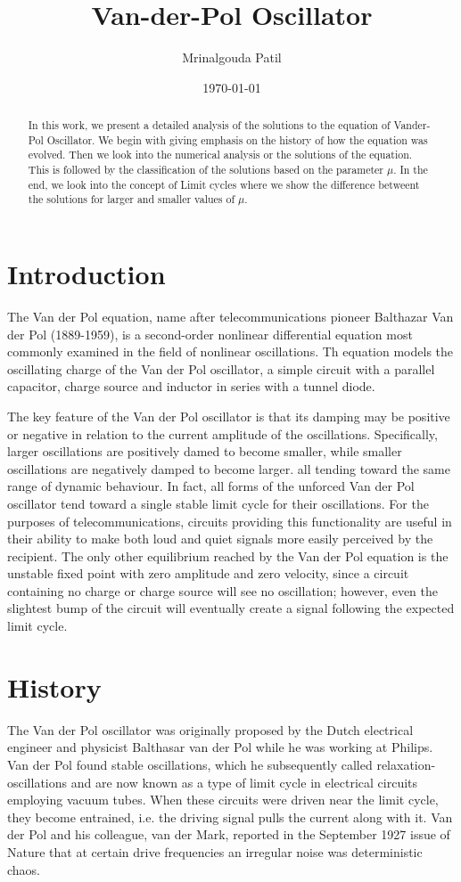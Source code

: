 \documentclass[12pt, a4paper]{report}
\title{Van-der-Pol Oscillator}
\author{Mrinalgouda Patil}
\affil{Rollno: 130010061}
\date{\today}
\begin{document}
\maketitle

\begin{abstract}
In this work, we present a detailed analysis of the solutions to the equation of Vander-Pol Oscillator. We begin with giving emphasis on the history of how the equation was evolved. Then we look into the numerical analysis or the solutions of the equation. This is followed by the classification of the solutions based on the parameter $\mu$. In the end, we look into the concept of Limit cycles where we show the difference betweent the solutions for larger and smaller values of $\mu$. 
\end{abstract}

\chapter{Introduction}
The Van der Pol equation, name after telecommunications pioneer Balthazar Van der Pol (1889-1959), is a second-order nonlinear differential equation most commonly examined in the field of nonlinear oscillations. Th equation models the oscillating charge of the Van der Pol oscillator, a simple circuit with a parallel capacitor, charge source and inductor in series with a tunnel diode.
\par
The key feature  of the Van der Pol oscillator is that its damping may be positive or negative in relation to the current amplitude of the oscillations. Specifically, larger oscillations are positively damed to become smaller, while smaller oscillations are negatively damped to become larger. all tending toward the same range of dynamic behaviour. In fact, all forms of the unforced Van der Pol oscillator tend toward a single stable limit cycle for their oscillations. For the purposes of telecommunications, circuits providing this functionality are useful in their ability to make both loud and quiet signals more easily perceived by the recipient. The only other equilibrium reached by the Van der Pol equation is the unstable  fixed point with zero amplitude and zero velocity, since a circuit containing no charge or charge source will see no oscillation; however, even the slightest bump of the circuit will eventually create a signal following the expected limit cycle.

\chapter{History}
The Van der Pol oscillator was originally proposed by the Dutch electrical engineer and physicist Balthasar van der Pol while he was working at Philips. Van der Pol found stable oscillations, which he subsequently called relaxation-oscillations and are now known as a type of limit cycle in electrical circuits employing vacuum tubes. When these circuits were driven near the limit cycle, they become entrained, i.e. the driving signal pulls the current along with it. Van der Pol and his colleague, van der Mark, reported in the September 1927 issue of Nature that at certain drive frequencies an irregular noise was deterministic chaos. \cite{Lienard}
\end{document}
